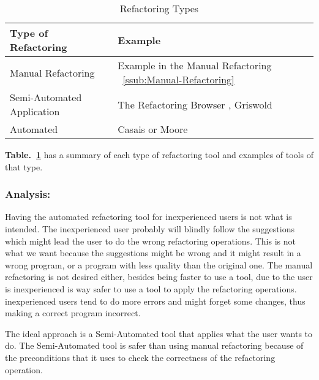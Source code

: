 


\begin{table}[h]
\caption{Refactoring Types}
\label{tab-Refactoring-Types}
\begin{tabular}{|l|l|}
\hline
\textbf{Type of Refactoring} & \textbf{Example}                                                                             \\ \hline
Manual Refactoring           & Example in the Manual Refactoring ~\ref{ssub:Manual-Refactoring}      \\ \hline
Semi-Automated Application   & The Refactoring Browser \cite{roberts1997refactoring}, Griswold \cite{griswold1993automated} \\ \hline
Automated                    & Casais \cite{casais1994automatic} or Moore \cite{moore1996automatic}             \\ \hline
\end{tabular}
\end{table}



{\bf Table.~\ref{tab-Refactoring-Types}} has a summary of each type of refactoring tool and examples of tools of that type.

\subsubsection{Analysis:}
Having the automated refactoring tool for inexperienced users is not what is intended. 
The inexperienced user probably will blindly follow the suggestions which might lead the user to do the wrong refactoring operations.
This is not what we want because the suggestions might be wrong and it might result in a wrong program, or a program with less quality than the original one.
The manual refactoring is not desired either, besides being faster to use a tool, due to the user is inexperienced is way safer to use a tool to apply the refactoring operations. 
inexperienced users tend to do more errors and might forget some changes, thus making a correct program incorrect.

The ideal approach is a Semi-Automated tool that applies what the user wants to do. 
The Semi-Automated tool is safer than using manual refactoring because of the preconditions that it uses to check the correctness of the refactoring operation.

